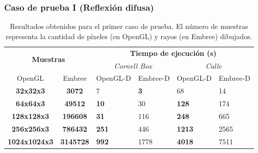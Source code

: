\subsubsection{Caso de prueba I (Reflexión difusa)}

\begin{table}[htbp]
	\centering
	\begin{tabular}{|c|c|l|l||l|l|}
		\hline
		\multicolumn{2}{|c|}{\multirow{2}{*}{\textbf{Muestras}}} & \multicolumn{4}{c|}{\textbf{Tiempo de ejecución (s)}}                                                                                  \\ \cline{3-6} 
		\multicolumn{2}{|c|}{}                   & \multicolumn{2}{c||}{\textit{Cornell Box}}                 & \multicolumn{2}{c|}{\textit{Calle}}                      \\ \cline{1-6}
		\multicolumn{1}{|c|}{OpenGL} &\multicolumn{1}{c|}{Embree} &
		\multicolumn{1}{c|}{OpenGL-D} & \multicolumn{1}{c||}{Embree-D} & \multicolumn{1}{c|}{OpenGL-D} & \multicolumn{1}{c|}{Embree-D} \\ \hline
		\textbf{32x32x3}                        &
		\textbf{3072}                        & 7                           & \textbf{3}                           & 68                          & 14                          \\ \hline
		\textbf{64x64x3}                        &
		\textbf{49512}                       & \textbf{10}                          & 30                          & \textbf{128}                         & 174                         \\ \hline
		\textbf{128x128x3}                        &
		\textbf{196608}                       & \textbf{31}                          & 116                         & \textbf{248}                         & 665                         \\ \hline
		\textbf{256x256x3}                        &
		\textbf{786432}   & \textbf{251}                         & 446                         & \textbf{1213}                        & 2565                        \\ \hline
		\textbf{1024x1024x3}                        &
		\textbf{3145728}                      & \textbf{992}                         & 1778                        & \textbf{4018}                        & 7511                        \\ \hline
	\end{tabular}
	\caption{Resultados obtenidos para el primer caso de prueba. El número de muestras representa la cantidad de píxeles (en OpenGL) y rayos (en Embree) dibujados.}
	\label{tab:tablecaso1}
\end{table}

